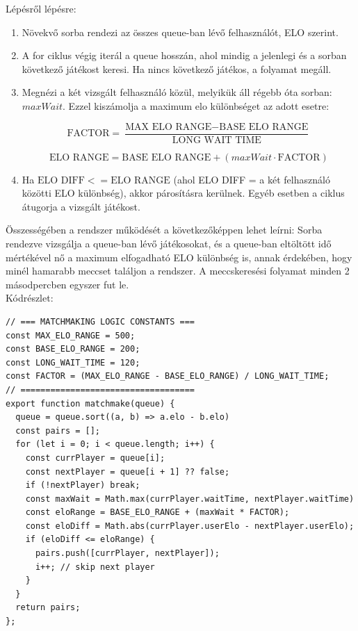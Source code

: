 Lépésről lépésre:
\begin{enumerate}
    \item Növekvő sorba rendezi az összes queue-ban lévő felhasználót, ELO szerint.
    \item A for ciklus végig iterál a queue hosszán, ahol mindig a jelenlegi és a sorban következő játékost keresi. Ha nincs következő játékos, a folyamat megáll.
    \item Megnézi a két vizsgált felhasználó közül, melyikük áll régebb óta sorban: $maxWait$. Ezzel kiszámolja a maximum elo különbséget az adott esetre:
    
    \begin{equation*}
        \text{FACTOR} = \frac{\text{MAX ELO RANGE} - \text{BASE ELO RANGE}}{\text{LONG WAIT TIME}}
    \end{equation*}
    
    \begin{equation*}
        \text{ELO RANGE} = \text{BASE ELO RANGE} + (maxWait \cdot \text{FACTOR})
    \end{equation*}

    \item Ha $\text{ELO DIFF} <= \text{ELO RANGE}$ (ahol ELO DIFF = a két felhasználó közötti ELO különbség), akkor párosításra kerülnek. Egyéb esetben a ciklus átugorja a vizsgált játékost.
\end{enumerate}
Összességében a rendszer működését a következőképpen lehet leírni: Sorba rendezve vizsgálja a queue-ban lévő játékosokat, és a queue-ban eltöltött idő mértékével nő a maximum elfogadható ELO különbség is, annak érdekében, hogy minél hamarabb meccset találjon a rendszer. A meccskeresési folyamat minden 2 másodpercben egyszer fut le.
\\
Kódrészlet:
\begin{verbatim}
// === MATCHMAKING LOGIC CONSTANTS ===
const MAX_ELO_RANGE = 500;
const BASE_ELO_RANGE = 200;
const LONG_WAIT_TIME = 120;
const FACTOR = (MAX_ELO_RANGE - BASE_ELO_RANGE) / LONG_WAIT_TIME;
// ===================================
export function matchmake(queue) {
  queue = queue.sort((a, b) => a.elo - b.elo)
  const pairs = [];
  for (let i = 0; i < queue.length; i++) {
    const currPlayer = queue[i];
    const nextPlayer = queue[i + 1] ?? false;
    if (!nextPlayer) break;
    const maxWait = Math.max(currPlayer.waitTime, nextPlayer.waitTime)
    const eloRange = BASE_ELO_RANGE + (maxWait * FACTOR);
    const eloDiff = Math.abs(currPlayer.userElo - nextPlayer.userElo);
    if (eloDiff <= eloRange) {
      pairs.push([currPlayer, nextPlayer]);
      i++; // skip next player
    }
  }
  return pairs;
};
\end{verbatim}
